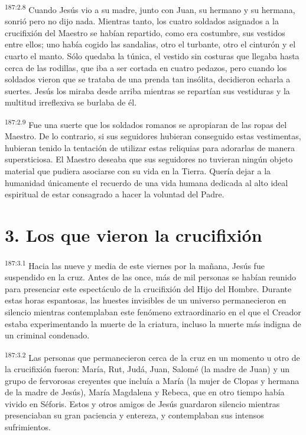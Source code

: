 \par 
\textsuperscript{187:2.8} Cuando Jesús vio a su madre, junto con Juan, su hermano y su hermana, sonrió pero no dijo nada. Mientras tanto, los cuatro soldados asignados a la crucifixión del Maestro se habían repartido, como era costumbre, sus vestidos entre ellos; uno había cogido las sandalias, otro el turbante, otro el cinturón y el cuarto el manto. Sólo quedaba la túnica, el vestido sin costuras que llegaba hasta cerca de las rodillas, que iba a ser cortada en cuatro pedazos, pero cuando los soldados vieron que se trataba de una prenda tan insólita, decidieron echarla a suertes. Jesús los miraba desde arriba mientras se repartían sus vestiduras y la multitud irreflexiva se burlaba de él.

\par 
\textsuperscript{187:2.9} Fue una suerte que los soldados romanos se apropiaran de las ropas del Maestro. De lo contrario, si sus seguidores hubieran conseguido estas vestimentas, hubieran tenido la tentación de utilizar estas reliquias para adorarlas de manera supersticiosa. El Maestro deseaba que sus seguidores no tuvieran ningún objeto material que pudiera asociarse con su vida en la Tierra. Quería dejar a la humanidad únicamente el recuerdo de una vida humana dedicada al alto ideal espiritual de estar consagrado a hacer la voluntad del Padre.

\section*{3. Los que vieron la crucifixión}
\par 
\textsuperscript{187:3.1} Hacia las nueve y media de este viernes por la mañana, Jesús fue suspendido en la cruz. Antes de las once, más de mil personas se habían reunido para presenciar este espectáculo de la crucifixión del Hijo del Hombre. Durante estas horas espantosas, las huestes invisibles de un universo permanecieron en silencio mientras contemplaban este fenómeno extraordinario en el que el Creador estaba experimentando la muerte de la criatura, incluso la muerte más indigna de un criminal condenado.

\par 
\textsuperscript{187:3.2} Las personas que permanecieron cerca de la cruz en un momento u otro de la crucifixión fueron: María, Rut, Judá, Juan, Salomé (la madre de Juan) y un grupo de fervorosas creyentes que incluía a María (la mujer de Clopas y hermana de la madre de Jesús), María Magdalena y Rebeca, que en otro tiempo había vivido en Séforis. Estos y otros amigos de Jesús guardaron silencio mientras presenciaban su gran paciencia y entereza, y contemplaban sus intensos sufrimientos.

